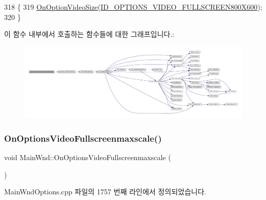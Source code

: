 \begin{DoxyCode}
318 \{
319   \mbox{\hyperlink{class_main_wnd_a3db1b6ad5af63ac2c3476868c015f6aa}{OnOptionVideoSize}}(\mbox{\hyperlink{resource_8h_a29646b6d927f8acef2633bec4e14c8b1}{ID\_OPTIONS\_VIDEO\_FULLSCREEN800X600}});
320 \}
\end{DoxyCode}
이 함수 내부에서 호출하는 함수들에 대한 그래프입니다.\+:
\nopagebreak
\begin{figure}[H]
\begin{center}
\leavevmode
\includegraphics[width=350pt]{class_main_wnd_a2b287efa1b6df3057aedd5e5e6a85d6e_cgraph}
\end{center}
\end{figure}
\mbox{\label{class_main_wnd_a31678f98dfdc982e2f4e242293fc85e0}} 
\subsubsection{\texorpdfstring{On\+Options\+Video\+Fullscreenmaxscale()}{OnOptionsVideoFullscreenmaxscale()}}
{\footnotesize\ttfamily void Main\+Wnd\+::\+On\+Options\+Video\+Fullscreenmaxscale (\begin{DoxyParamCaption}{ }\end{DoxyParamCaption})\hspace{0.3cm}{\ttfamily [protected]}}



Main\+Wnd\+Options.\+cpp 파일의 1757 번째 라인에서 정의되었습니다.


